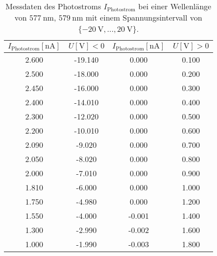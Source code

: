 

\begin{table}
    \centering
    \caption{Messdaten des Photostroms $I_{\text{Photostrom}}$ bei einer Wellenlänge von $\SI{577}{\nano\meter}$, $\SI{579}{\nano\meter}$ mit einem Spannungsintervall von $\{\SI{-20}{\volt},... ,\SI{20}{\volt}\}$.}
    \label{tab:tab1}
    \begin{tabular}{c c || c c}
        \toprule
        $I_{\text{Photostrom}}[\si{\nano\ampere}]$ & $U [\si{\volt}] < 0$ & $I_{\text{Photostrom}}[\si{\nano\ampere}]$ & $U [\si{\volt}] > 0$ \\
        \midrule
        2.600         &         -19.140  &  0.000        &           0.100    \\    
        2.500         &         -18.000  &  0.000        &           0.200    \\    
        2.450         &         -16.000  &  0.000        &           0.300    \\    
        2.400         &         -14.010  &  0.000        &           0.400    \\    
        2.300         &         -12.020  &  0.000        &           0.500    \\    
        2.200         &         -10.010  &  0.000        &           0.600    \\    
        2.090         &         -9.020  &  0.000        &           0.700    \\    
        2.050         &         -8.020  &  0.000        &           0.800    \\    
        2.000         &         -7.010  &  0.000        &           0.900    \\    
        1.810         &         -6.000  &  0.000        &           1.000    \\    
        1.750         &         -4.980  &  0.000        &           1.200    \\    
        1.550         &         -4.000  &  -0.001       &           1.400    \\    
        1.300         &         -2.990  &  -0.002       &           1.600    \\    
        1.000         &         -1.990  &  -0.003       &           1.800    \\    

\end{tabular}
\end{table}
